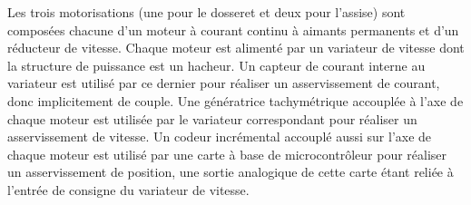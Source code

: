 %




Les trois motorisations (une pour le dosseret et deux pour l'assise)
sont composées chacune d'un moteur à courant continu à aimants
permanents et d'un réducteur de vitesse. Chaque moteur est alimenté par
un variateur de vitesse dont la structure de puissance est un hacheur.
Un capteur de courant interne au variateur est utilisé par ce dernier pour réaliser un asservissement de courant, donc implicitement de couple. Une génératrice tachymétrique accouplée
à l'axe de chaque moteur est utilisée par le variateur correspondant
pour réaliser un asservissement de vitesse. Un codeur incrémental
accouplé aussi sur l'axe de chaque moteur est utilisé par une carte à
base de microcontrôleur pour réaliser un asservissement de position, une
sortie analogique de cette carte étant reliée à l'entrée de consigne du
variateur de vitesse.
\fi
\fi

%
%
%


